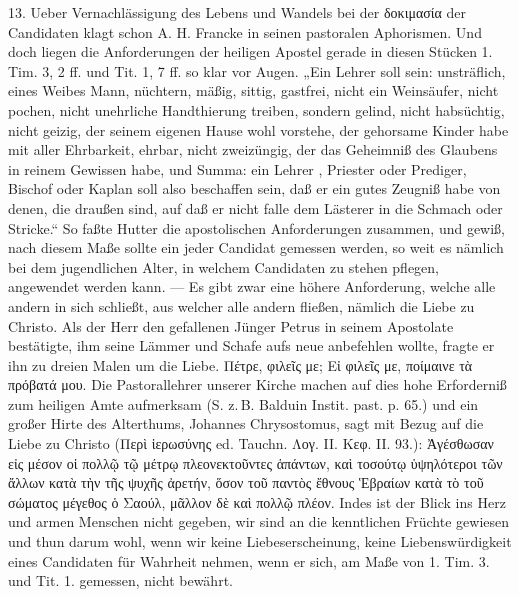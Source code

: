 13. Ueber Vernachlässigung des Lebens und Wandels bei der δοκιμασία der Candidaten klagt schon A. H. Francke in seinen pastoralen Aphorismen. Und doch liegen die Anforderungen der heiligen Apostel gerade in diesen Stücken 1. Tim. 3, 2 ff. und Tit. 1, 7 ff. so klar vor Augen. „Ein Lehrer soll sein: unsträflich, eines Weibes Mann, nüchtern, mäßig, sittig, gastfrei, nicht ein Weinsäufer, nicht pochen, nicht unehrliche Handthierung treiben, sondern gelind, nicht habsüchtig, nicht geizig, der seinem eigenen Hause wohl vorstehe, der gehorsame Kinder habe mit aller Ehrbarkeit, ehrbar, nicht zweizüngig, der das Geheimniß des Glaubens in reinem Gewissen habe, und Summa: ein Lehrer
%
, Priester oder Prediger, Bischof oder Kaplan soll also beschaffen sein, daß er ein gutes Zeugniß habe von denen, die draußen sind, auf daß er nicht falle dem Lästerer in die Schmach oder Stricke.“ So faßte Hutter die apostolischen Anforderungen zusammen, und gewiß, nach diesem Maße sollte ein jeder Candidat gemessen werden, so weit es nämlich bei dem jugendlichen Alter, in welchem Candidaten zu stehen pflegen, angewendet werden kann. — Es gibt zwar eine höhere Anforderung, welche alle andern in sich schließt, aus welcher alle andern fließen, nämlich die Liebe zu Christo. Als der Herr den gefallenen Jünger Petrus in seinem Apostolate bestätigte, ihm seine Lämmer und Schafe aufs neue anbefehlen wollte, fragte er ihn zu dreien Malen um die Liebe. Πέτρε, φιλεῖς με; Εἰ φιλεῖς με, ποίμαινε τὰ πρόβατά μου. Die Pastorallehrer unserer Kirche machen auf dies hohe Erforderniß zum heiligen Amte aufmerksam (S. z.\,B. Balduin Instit. past. p. 65.) und ein großer Hirte des Alterthums, Johannes Chrysostomus, sagt mit Bezug auf die Liebe zu Christo (Περὶ ἱερωσύνης ed. Tauchn. Λογ. II. Κεφ. II. 93.): Ἀγέσθωσαν εἰς μέσον οἱ πολλῷ τῷ μέτρῳ πλεονεκτοῦντες ἁπάντων, καὶ τοσούτῳ ὑψηλότεροι τῶν ἄλλων κατὰ τὴν τῆς ψυχῆς ἀρετήν, ὅσον τοῦ παντὸς ἔθνους Ἑβραίων κατὰ τὸ τοῦ σώματος μέγεθος ὁ Σαούλ, μᾶλλον δὲ καὶ πολλῷ πλέον. Indes ist der Blick ins Herz und armen Menschen nicht gegeben, wir sind an die kenntlichen Früchte gewiesen und thun darum wohl, wenn wir keine Liebeserscheinung, keine Liebenswürdigkeit eines Candidaten
für Wahrheit nehmen, wenn er sich, am Maße von 1. Tim. 3. und Tit. 1. gemessen, nicht bewährt.


